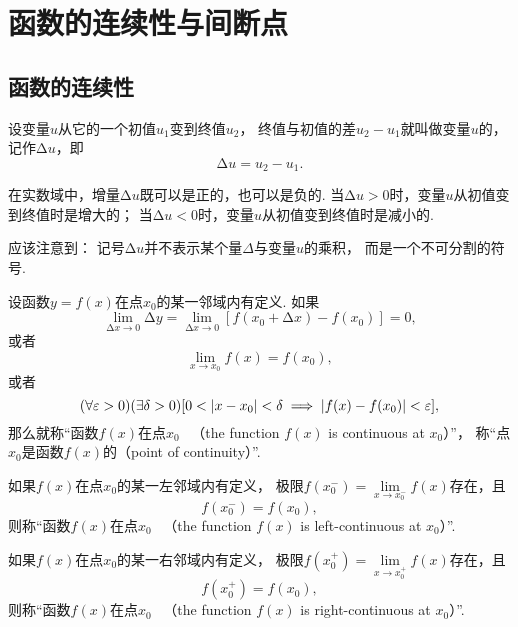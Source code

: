 \section{函数的连续性与间断点}\label{section:极限.函数的连续性与间断点}
\subsection{函数的连续性}
设变量\(u\)从它的一个初值\(u_1\)变到终值\(u_2\)，
终值与初值的差\(u_2 - u_1\)就叫做变量\(u\)的，
记作\(\increment u\)，即\[
	\increment u = u_2 - u_1.
\]

在实数域中，增量\(\increment u\)既可以是正的，也可以是负的.
当\(\increment u > 0\)时，变量\(u\)从初值变到终值时是增大的；
当\(\increment u < 0\)时，变量\(u\)从初值变到终值时是减小的.

应该注意到：
记号\(\increment u\)并不表示某个量\(\Delta\)与变量\(u\)的乘积，
而是一个不可分割的符号.

\begin{definition}\label{definition:极限.函数在一点的连续性}
设函数\(y=f(x)\)在点\(x_0\)的某一邻域内有定义.
如果\[
	\lim\limits_{\increment x\to0} \increment y
	=\lim\limits_{\increment x\to0} [f(x_0 + \increment x)-f(x_0)]
	=0,
\]
或者\[
	\lim\limits_{x \to x_0} f(x) = f(x_0),
\]
或者\[
	(\forall \varepsilon > 0)
	(\exists \delta > 0)
	[
		0 < \abs{x - x_0} < \delta
		\implies
		\abs{f(x) - f(x_0)} < \varepsilon
	],
\]
那么就称“函数\(f(x)\)在点\(x_0\)~
（the function \(f(x)\) is continuous at \(x_0\)）”，
称“点\(x_0\)是函数\(f(x)\)的（point of continuity）”.

如果\(f(x)\)在点\(x_0\)的某一左邻域内有定义，
极限\(f(x_0^-) = \lim\limits_{x \to x_0^-} f(x)\)存在，且\[
	f(x_0^-) = f(x_0),
\]
则称“函数\(f(x)\)在点\(x_0\)~
（the function \(f(x)\) is left-continuous at \(x_0\)）”.

如果\(f(x)\)在点\(x_0\)的某一右邻域内有定义，
极限\(f(x_0^+) = \lim\limits_{x \to x_0^+} f(x)\)存在，且\[
	f(x_0^+) = f(x_0),
\]
则称“函数\(f(x)\)在点\(x_0\)~
（the function \(f(x)\) is right-continuous at \(x_0\)）”.
\end{definition}

\begin{figure}[ht]
	\centering
	\def\fn(#1){ln(#1+3)*4-4}
	\caption{}
\end{figure}

